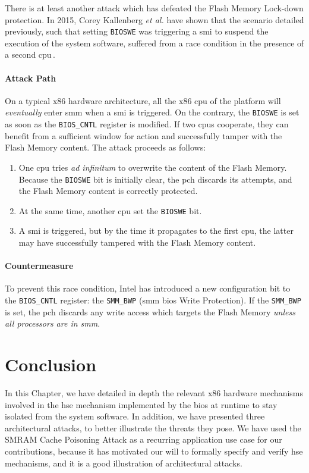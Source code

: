 There is at least another attack which has defeated the Flash Memory Lock-down
protection.
%
In 2015, Corey Kallenberg \emph{et al.} have shown that the scenario detailed
previously, such that setting \texttt{BIOSWE} was triggering a \ac{smi} to suspend
the execution of the system software, suffered from a race condition in the presence
of a second \ac{cpu}\,\cite{kallenberg2015racecondition}.

\paragraph{Attack Path}
%
On a typical x86 hardware architecture, all the x86 \ac{cpu} of the platform
will \emph{eventually} enter \ac{smm} when a \ac{smi} is triggered.
%
On the contrary, the \texttt{BIOSWE} is set as soon as the \texttt{BIOS\_CNTL}
register is modified.
%
If two \acp{cpu} cooperate, they can benefit from a sufficient window for action
and successfully tamper with the Flash Memory content.
%
The attack proceeds as follows:

\begin{enumerate}
\item One \ac{cpu} tries \emph{ad infinitum} to overwrite the content of the
  Flash Memory. Because the \texttt{BIOSWE} bit is initially clear, the \ac{pch}
  discards its attempts, and the Flash Memory content is correctly protected.
%
\item At the same time, another \ac{cpu} set the \texttt{BIOSWE} bit.
%
\item A \ac{smi} is triggered, but by the time it propagates to the first
  \ac{cpu}, the latter may have successfully tampered with the Flash Memory
  content.
%
\end{enumerate}

\paragraph{Countermeasure}
%
To prevent this race condition, Intel has introduced a new configuration bit to
the \texttt{BIOS\_CNTL} register: the \texttt{SMM\_BWP} (\ac{smm} \ac{bios}
Write Protection).
%
If the \texttt{SMM\_BWP} is set, the \ac{pch} discards any write access which targets
the Flash Memory \emph{unless all processors are in \ac{smm}}.

\section{Conclusion}
\label{sec:usecase:conclusion}

In this Chapter, we have detailed in depth the relevant x86 hardware mechanisms
involved in the \ac{hse} mechanism implemented by the \ac{bios} at runtime to
stay isolated from the system software.
%
In addition, we have presented three architectural attacks, to better illustrate
the threats they pose.
%
We have used the SMRAM Cache Poisoning Attack as a recurring application use
case for our contributions, because it has motivated our will to formally
specify and verify \ac{hse} mechanisms, and it is a good illustration of
architectural attacks.
